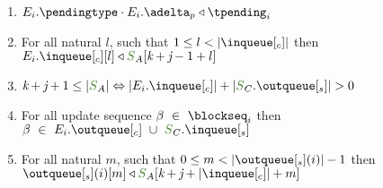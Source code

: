 \documentclass[envcountsect,runningheads,orivec]{llncs}
\begin{document}
\begin{theorem}
\begin{enumerate}
	\item $E_{i}.\pending \cdot E_{i}.\pushbuffer \triangleleft \tpending_i$
	\item For all natural $l$, such that $1 \leq l < |\inclient|$ then $E_{i}.\inclient[l] \triangleleft \queuemessage_A[\tknown + \treceivebuffer - 1 +l]$
	\item $\tknown + \treceivebuffer + 1 \leq |\queuemessage_A| \Leftrightarrow |E_{i}.\inclient| + |\queuemessage_C.\outserver| > 0$
	\item For all update sequence $\beta \ \in \ \tsent_i$ then $\beta \ \in \ E_{i}.\outclient \ \cup \ \queuemessage_C.\inserver$
		\item For all natural $m$, such that $0 \leq m < |\outserver(i)| - 1$ then $\outserver(i)[m] \triangleleft \queuemessage_A[\tknown + \treceivebuffer + |\inclient| + m]$

		

\end{enumerate}
\end{theorem}
\end{document}
